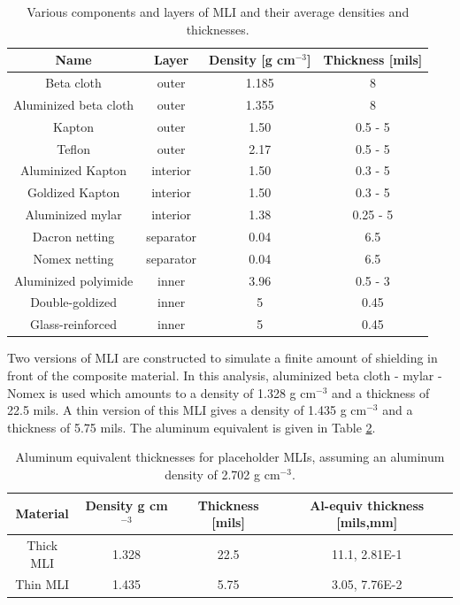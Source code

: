\documentclass{hitec}
\begin{document}
\begin{table}[h]\centering
	\caption{Various components and layers of MLI and their average densities and thicknesses.}\label{tab:MLI}
	\begin{tabular}{|c | c | c | c |}\hline
		Name & Layer & Density [g cm$^{-3}$] & Thickness [mils] \\\hline
		Beta cloth            & outer     & 1.185 & 8 \\\hline
		Aluminized beta cloth & outer     & 1.355 & 8 \\\hline
		Kapton                & outer     & 1.50  & 0.5 - 5 \\\hline
		Teflon                & outer     & 2.17  & 0.5 - 5 \\\hline
		Aluminized Kapton     & interior  & 1.50  & 0.3 - 5 \\\hline
		Goldized Kapton       & interior  & 1.50  & 0.3 - 5 \\\hline
		Aluminized mylar      & interior  & 1.38  & 0.25 - 5 \\\hline
		Dacron netting        & separator & 0.04  & 6.5 \\\hline
		Nomex netting         & separator & 0.04  & 6.5 \\\hline
		Aluminized polyimide  & inner     & 3.96  & 0.5 - 3 \\\hline
		Double-goldized       & inner     & 5     & 0.45 \\\hline
		Glass-reinforced      & inner     & 5     & 0.45 \\\hline
	\end{tabular}
\end{table}

Two versions of MLI are constructed to simulate a finite amount of shielding in front of the composite material. In this analysis, aluminized beta cloth - mylar - Nomex is used which amounts to a density of 1.328 g cm$^{-3}$ and a thickness of 22.5 mils. A thin version of this MLI gives a density of 1.435 g cm$^{-3}$ and a thickness of 5.75 mils. The aluminum equivalent is given in Table \ref{tab:al_equiv_MLI}.

\begin{table}[h]\centering
	\caption{Aluminum equivalent thicknesses for placeholder MLIs, assuming an aluminum density of 2.702 g cm$^{-3}$.}\label{tab:al_equiv_MLI}
	\begin{tabular}{|c | c | c | c |}\hline
		Material & Density g cm$^{-3}$ & Thickness [mils] & Al-equiv thickness [mils,mm] \\\hline
		Thick MLI  & 1.328 & 22.5 & 11.1, 2.81E-1 \\\hline
		Thin MLI   & 1.435 & 5.75 & 3.05, 7.76E-2   \\\hline
	\end{tabular}
\end{table}
\end{document}
